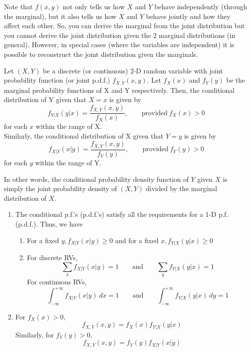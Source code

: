 \begin{note}
\end{note}
Note that $f(x,y)$ not only tells us how $X$ and $Y$ behave independently (through the marginal), but it also tells us how $X$ and $Y$ behave jointly and how they affect each other. So, you can derive the marginal from the joint distribution but you cannot derive the joint distribution given the 2 marginal distributions (in general). However, in special cases (where the variables are independent) it is possible to reconstruct the joint distribution given the marginals.

\begin{definition}
Let $(X,Y)$ be a discrete (or continuous) 2-D random variable with joint probability function (or joint p.d.f.) $f_{X,Y}(x,y)$. Let $f_X(x)$ and $f_Y(y)$ be the marginal probability functions of X and Y respectively. Then, the conditional distribution of Y given that $X = x$ is given by 
$$
f_{Y|X}(y|x) = \dfrac{f_{X,Y}(x,y)}{f_X(x)}, \qquad \text{provided} \ f_X(x) > 0
$$ for each $x$ within the range of X. \\
Similarly, the conditional distribution of X given that $Y = y$ is given by 
$$
f_{X|Y}(x|y) = \dfrac{f_{X,Y}(x,y)}{f_Y(y)}, \qquad \text{provided} \ f_Y(y) > 0
$$ for each $y$ within the range of Y.
\end{definition}
In other words, the conditional probability density function of $Y$ given $X$ is simply the joint probability density of $(X,Y)$ divided by the marginal distribution of $X$.
\begin{note}[Remarks]
\end{note}
\begin{enumerate}
    \item The conditional p.f.'s (p.d.f.'s) satisfy all the requirements for a 1-D p.f. (p.d.f.). Thus, we have 
        \begin{enumerate}
            \item For a fixed $y, f_{X|Y}(x|y) \geq 0$ and for a fixed $x, f_{Y|X}(y|x) \geq 0$
            \item For discrete RVs,
            $$
            \sum_x f_{X|Y}(x|y) = 1 \qquad \text{and} \qquad \sum_y f_{Y|X}(y|x) = 1
            $$
            For continuous RVs,
            $$
            \int_{-\infty}^{+\infty} f_{X|Y}(x|y)\ dx = 1 \qquad \text{and} \qquad \int_{-\infty}^{+\infty} f_{Y|X}(y|x)\ dy = 1
            $$
        \end{enumerate}
    \item For $f_X(x) > 0,$ 
    $$f_{X,Y}(x,y) = f_X(x)f_{Y|X}(y|x)$$
    Similarly, for $f_Y(y) > 0,$
    $$ f_{X,Y}(x,y) = f_Y(y) f_{X|Y}(x|y)$$
\end{enumerate}

